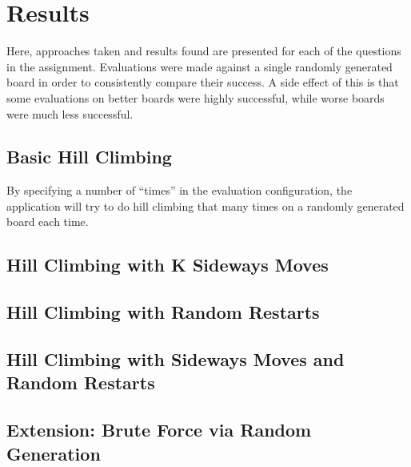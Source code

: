 \section{Results}
\label{section:results}
Here, approaches taken and results found are presented for each of the questions in the assignment. Evaluations were
made against a single randomly generated board in order to consistently compare their success. A side effect of this
is that some evaluations on better boards were highly successful, while worse boards were much less successful.

\subsection{Basic Hill Climbing}
By specifying a number of ``times'' in the evaluation configuration, the application will try to do hill climbing that
many times on a randomly generated board each time. 

\subsection{Hill Climbing with K Sideways Moves}


\subsection{Hill Climbing with Random Restarts}


\subsection{Hill Climbing with Sideways Moves and Random Restarts}


\subsection{Extension: Brute Force via Random Generation}

